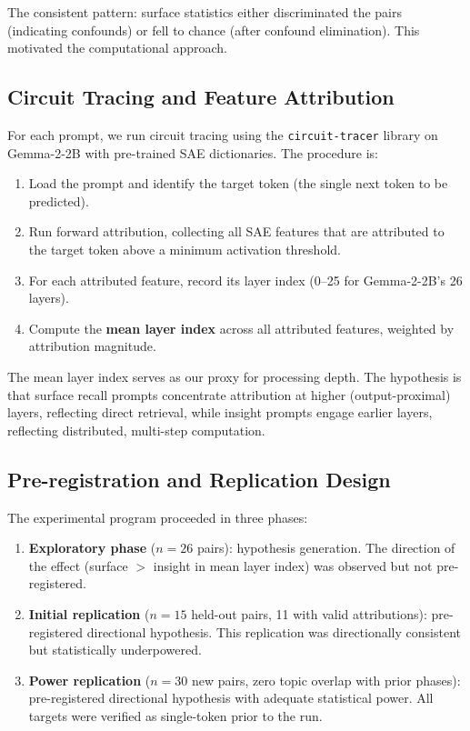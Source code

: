 \documentclass[10pt]{article}
\begin{document}
The consistent pattern: surface statistics either discriminated the pairs (indicating confounds) or fell to chance (after confound elimination). This motivated the computational approach.

\subsection{Circuit Tracing and Feature Attribution}
\label{sec:circuit_tracing}

For each prompt, we run circuit tracing using the \texttt{circuit-tracer} library on Gemma-2-2B with pre-trained SAE dictionaries. The procedure is:

\begin{enumerate}
    \item Load the prompt and identify the target token (the single next token to be predicted).
    \item Run forward attribution, collecting all SAE features that are attributed to the target token above a minimum activation threshold.
    \item For each attributed feature, record its layer index (0--25 for Gemma-2-2B's 26 layers).
    \item Compute the \textbf{mean layer index} across all attributed features, weighted by attribution magnitude.
\end{enumerate}

The mean layer index serves as our proxy for processing depth. The hypothesis is that surface recall prompts concentrate attribution at higher (output-proximal) layers, reflecting direct retrieval, while insight prompts engage earlier layers, reflecting distributed, multi-step computation.

\subsection{Pre-registration and Replication Design}

The experimental program proceeded in three phases:

\begin{enumerate}
    \item \textbf{Exploratory phase} ($n{=}26$ pairs): hypothesis generation. The direction of the effect (surface $>$ insight in mean layer index) was observed but not pre-registered.
    \item \textbf{Initial replication} ($n{=}15$ held-out pairs, 11 with valid attributions): pre-registered directional hypothesis. This replication was directionally consistent but statistically underpowered.
    \item \textbf{Power replication} ($n{=}30$ new pairs, zero topic overlap with prior phases): pre-registered directional hypothesis with adequate statistical power. All targets were verified as single-token prior to the run.
\end{enumerate}
\end{document}
